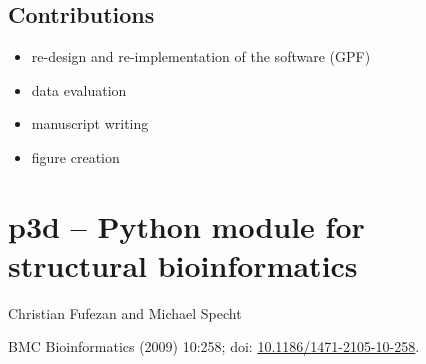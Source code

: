 \subsection*{Contributions}

\begin{itemize}
\item re-design and re-implementation of the software (GPF)
\item data evaluation
\item manuscript writing
\item figure creation
\end{itemize}

\cleardoublepage
{}

% 
% 
% 

\cleardoublepage
\section{p3d -- Python module for structural bioinformatics}

Christian Fufezan and Michael Specht

BMC Bioinformatics (2009) 10:258; doi: \href{http://dx.doi.org/10.1186/1471-2105-10-258}{10.1186/1471-2105-10-258}.

